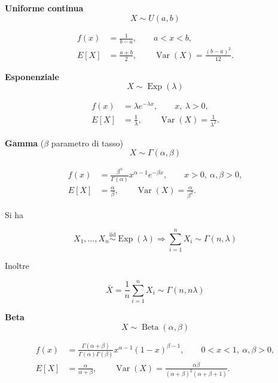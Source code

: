 \documentclass{article}
\begin{document}

\noindent\textbf{Uniforme continua} \[ \boxed{X\sim U(a,b)} \]

\[
\begin{aligned}
f(x)
&=
\frac1{b-a},
\qquad a<x<b,
\\[0.5em]
E[X]
&=
\frac{a+b}{2},
\qquad
\operatorname{Var}(X)=\frac{(b-a)^2}{12}.
\end{aligned}
\]

\newpage

\noindent\textbf{Esponenziale} \[ \boxed{X\sim\operatorname{Exp}(\lambda)} \]

\[
\begin{aligned}
f(x)
&=
\lambda e^{-\lambda x},
\qquad x,\ \lambda>0,
\\[0.5em]
E[X]
&=
\frac1\lambda,
\qquad
\operatorname{Var}(X)=\frac1{\lambda^2}.
\end{aligned}
\]

\medskip

\noindent\textbf{Gamma} ($\beta$ parametro di tasso) \[ \boxed{X\sim\Gamma(\alpha,\beta)} \]


\[
\begin{aligned}
f(x)
&=
\frac{\beta^\alpha}{\Gamma(\alpha)}
x^{\alpha-1}e^{-\beta x},
\qquad x>0,\ \alpha,\beta >0,
\\[0.5em]
E[X]
&=
\frac{\alpha}{\beta},
\qquad
\operatorname{Var}(X)=\frac{\alpha}{\beta^2}.
\end{aligned}
\]

Si ha

\[
X_1,\ldots,X_n
\stackrel{\mathrm{iid}}{\sim}
\operatorname{Exp}(\lambda)
\Rightarrow
\sum_{i=1}^{n}X_i
\sim
\Gamma(n,\lambda)
\]

Inoltre

\[
\bar X=\frac1n\sum_{i=1}^{n}X_i
\sim
\Gamma(n,n\lambda)
\]


\noindent\textbf{Beta} \[ \boxed{X\sim\operatorname{Beta}(\alpha,\beta)} \]

\[
\begin{aligned}
f(x)
&=
\frac{\Gamma(\alpha+\beta)}
{\Gamma(\alpha)\Gamma(\beta)}
x^{\alpha-1}(1-x)^{\beta-1},
\qquad 0<x<1,\ \alpha,\beta >0,
\\[0.5em]
E[X]
&=
\frac{\alpha}{\alpha+\beta},
\qquad
\operatorname{Var}(X)=
\frac{\alpha\beta}
{(\alpha+\beta)^2(\alpha+\beta+1)}.
\end{aligned}
\]
\end{document}
